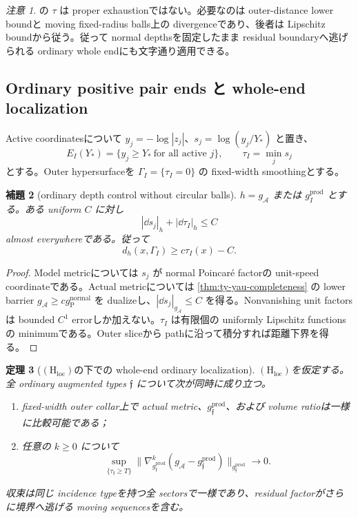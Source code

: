 \documentclass[11pt,a4paper]{ltjsarticle}
\newcommand{\cA}{\mathcal A}\newcommand{\cB}{\mathcal B}\newcommand{\cC}{\mathcal C}
\newcommand{\Hloc}{\ensuremath{(\mathrm H_{\mathrm{loc}})}}
\theoremstyle{plain}
\newtheorem{theorem}{定理}[section]\newtheorem{proposition}[theorem]{命題}
\newtheorem{lemma}[theorem]{補題}\newtheorem{corollary}[theorem]{系}
\theoremstyle{definition}
\theoremstyle{remark}
\newtheorem{remark}[theorem]{注意}\newtheorem{warning}[theorem]{警告}
\begin{document}
\begin{remark}
 の $\tau$ は proper exhaustionではない。必要なのは outer-distance lower boundと moving fixed-radius balls上の divergenceであり、後者は Lipschitz boundから従う。従って normal depthsを固定したまま residual boundaryへ逃げられる ordinary whole endにも文字通り適用できる。
\end{remark}

\subsection{Ordinary positive pair ends と whole-end localization}
Active coordinatesについて $y_j=-\log|z_j|$、$s_j=\log(y_j/Y_*)$ と置き、
\[
 E_I(Y_*)=\{y_j\ge Y_*\ \text{for all active }j\},
 \qquad
 \tau_I=\min_j s_j
\]
とする。Outer hypersurfaceを $\Gamma_I=\{\tau_I=0\}$ の fixed-width smoothingとする。

\begin{lemma}[ordinary depth control without circular balls]\label{lem:ordinary-depth-control}
$h=g_{\cA}$ または $g_I^{\mathrm{prod}}$ とする。ある uniform $C$ に対し
\[
 |\dd s_j|_h+|\dd\tau_I|_h\le C
\]
almost everywhereである。従って
\[
 d_h(x,\Gamma_I)\ge c\tau_I(x)-C.
\]
\end{lemma}

\begin{proof}
Model metricについては $s_j$ が normal Poincar\'e factorの unit-speed coordinateである。Actual metricについては \cref{thm:ty-yau-completeness} の lower barrier $g_{\cA}\ge c g_{\mathrm P}^{\mathrm{normal}}$ を dualizeし、$|\dd s_j|_{g_{\cA}}\le C$ を得る。Nonvanishing unit factorsは bounded $C^1$ errorしか加えない。$\tau_I$ は有限個の uniformly Lipschitz functionsの minimumである。Outer sliceから pathに沿って積分すれば距離下界を得る。
\end{proof}

\begin{theorem}[\Hloc の下での whole-end ordinary localization]\label{thm:ordinary-localization}
\Hloc を仮定する。
全 ordinary augmented types $\mathfrak f$ について次が同時に成り立つ。
\begin{enumerate}[label=(Q\arabic*)]
 \item fixed-width outer collar上で actual metric、$g_{\mathfrak f}^{\mathrm{prod}}$、および volume ratioは一様に比較可能である；
 \item 任意の $k\ge0$ について
 \[
  \sup_{\{\tau_{\mathfrak f}\ge T\}}
  \|\nabla_{g_{\mathfrak f}^{\mathrm{prod}}}^{k}
   (g_{\cA}-g_{\mathfrak f}^{\mathrm{prod}})
  \|_{g_{\mathfrak f}^{\mathrm{prod}}}
  \longrightarrow0.
 \]
\end{enumerate}
収束は同じ incidence typeを持つ全 sectorsで一様であり、residual factorがさらに境界へ逃げる moving sequencesを含む。
\end{theorem}
\end{document}
